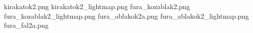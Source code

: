 kirakatok2.png
kirakatok2_lightmap.png
fura_kozablak2.png
fura_kozablak2_lightmap.png
fura_ablakok2a.png
fura_ablakok2_lightmap.png
fura_fal2a.png

